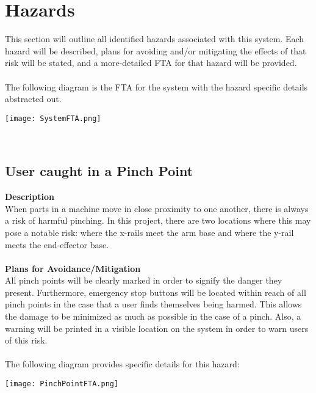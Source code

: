 \documentclass[titlepage]{article}
\begin{document}
\section{Hazards}
This section will outline all identified hazards associated with this system. Each hazard will be described, plans for avoiding and/or mitigating the effects of that risk will be stated, and a more-detailed FTA for that hazard will be provided.\\~\\
The following diagram is the FTA for the system with the hazard specific details abstracted out.\\
\begin{center}
	\texttt{[image: SystemFTA.png]}
\label{fig:yRailFig}
\end{center}~\\[-8mm]
\subsection{User caught in a Pinch Point}
\textbf{Description}\\
When parts in a machine move in close proximity to one another, there is always a risk of harmful pinching. In this project, there are two locations where this may pose a notable risk: where the x-rails meet the arm base and where the y-rail meets the end-effector base.\\~\\
\textbf{Plans for Avoidance/Mitigation}\\
All pinch points will be clearly marked in order to signify the danger they present. Furthermore, emergency stop buttons will be located within reach of all pinch points in the case that a user finds themselves being harmed. This allows the damage to be minimized as much as possible in the case of a pinch. Also, a warning will be printed in a visible location on the system in order to warn users of this risk.\\~\\
The following diagram provides specific details for this hazard:\\
\begin{center}
	\texttt{[image: PinchPointFTA.png]}
\label{fig:yRailFig}
\end{center}

\newpage
\end{document}
